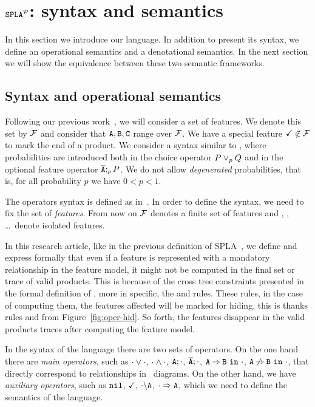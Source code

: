 \section{$\mathtt{SPLA{^{\cal P}}}$: syntax and semantics}
\label{sec:stat:sintaxMain}
In this section we introduce our language. In addition to present its syntax, we define an operational semantics and a denotational semantics. In the next section we will show the equivalence between these two semantic frameworks.


\subsection{Syntax and operational semantics}
\label{sec:stat:sintax}
Following our previous work~\cite{acl13,clc16}, we will consider a
set of features. We denote this set by ${\cal F}$ and consider that $\mathtt{A}, \mathtt{B},
\mathtt{C}$ range over ${\cal F}$. We have a special feature
$\checkmark\not\in{\cal F}$ to mark the end  of a product. We consider a syntax similar to
\fodaPA, where probabilities are introduced both in the choice operator $P \mathbin{\lor}_{p} Q $ and in
the optional feature operator $\overline{\mathtt{A}};_{p} P$. We do not allow
\emph{degenerated} probabilities, that is, for all probability $p$ we have $0< p<1$.

The operators syntax is defined as in~\cite{acl13,clc16}.
In order to define the syntax,
we need to fix the set of \emph{features}.
From now on ${\cal F}$ denotes a finite set  of features
and  , , \dots\ denote isolated features.


In this research article, like in the previous definition of SPLA~\cite{acl13,clc16},
we define and express formally that even if a feature is
represented with a mandatory relationship in the feature model,
it might not be computed in the final set or trace of valid products.
%
This is because of the cross tree constraints presented in the formal
definition of \fodaPA, more in specific, the  and  rules.
%
These rules, in the case of computing them, the features affected will be marked for hiding,
this is thanks rules  and  from
Figure~\ref{fig:oper-hid}.
%
So forth, the features
disappear in the valid products traces after computing the feature model.



In the syntax of the language there are two sets of operators.
On the one hand there are \emph{main operators}, such as $\cdot\mathbin{\lor}\cdot$, $\cdot\mathbin{\wedge}\cdot$, $\mathtt{A};\cdot$, $\overline{\mathtt{A}};\cdot$,
$\mathtt{A}\mathbin{\Rightarrow}\mathtt{B}\ \mathtt{in}\ \cdot$, $\mathtt{A}\mathbin{\not\Rightarrow}\mathtt{B}\ \mathtt{in}\ \cdot$,
that directly correspond to relationships in \FODA\ diagrams.
On the other hand, we have \emph{auxiliary operators}, such as $\mathtt{nil}$, $\checkmark$, $\cdot\backslash\mathtt{A}$, $\cdot\Rightarrow\mathtt{A}$,
which we need to define the semantics of the language.


